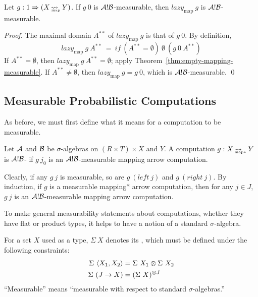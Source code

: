 \documentclass{llncs}
\newcommand{\arrow}{\rightsquigarrow}
\newcommand{\arrowlazy}{\ensuremath{lazy}}
\newcommand{\map}{_\mathrm{map}}
\DeclareMathOperator{\mapto}{\arrow_{\mspace{-21mu}\map}}
\newcommand{\lazymap}{\arrowlazy\map}
\DeclareMathOperator{\pmapto}{\arrow_{\mspace{-22mu}_{\mathrm{map*}}}}
\begin{document}
\begin{theorem}[measurability under $\lazymap$]
Let $g : 1 \tto (X \mapto Y)$. If $g~0$ is $\mathcal{A}!\mathcal{B}$-measurable, then $\lazymap~g$ is $\mathcal{A}!\mathcal{B}$-measurable.
\end{theorem}
\begin{proof}
The maximal domain $A^{**}$ of $\lazymap~g$ is that of $g~0$.
By definition,
\begin{equation}
	\lazymap~g~A^{**} \ = \ if~(A^{**} = \emptyset)~\emptyset~(g~0~A^{**})
\end{equation}
If $A^{**} = \emptyset$, then $\lazymap~g~A^{**} = \emptyset$; apply Theorem~\ref{thm:empty-mapping-measurable}.
If $A^{**} \neq \emptyset$, then $\lazymap~g = g~0$, which is $\mathcal{A}!\mathcal{B}$-measurable.
\qed
\end{proof}

\subsection{Measurable Probabilistic Computations}

As before, we must first define what it means for a computation to be measurable.

\begin{definition}
Let $\mathcal{A}$ and $\mathcal{B}$ be $\sigma$-algebras on $(R \times T) \times X$ and $Y$.
A computation $g : X \pmapto Y$ is $\mathcal{A}!\mathcal{B}$- if $g~j_0$ is an $\mathcal{A}!\mathcal{B}$-measurable mapping arrow computation.
\end{definition}

Clearly, if any $g~j$ is measurable, so are $g~(left~j)$ and $g~(right~j)$.
By induction, if $g$ is a measurable mapping* arrow computation, then for any $j \in J$, $g~j$ is an $\mathcal{A}!\mathcal{B}$-measurable mapping arrow computation.

To make general measurability statements about computations, whether they have flat or product types, it helps to have a notion of a standard $\sigma$-algebra.

\begin{definition}
For a set $X$ used as a type, $\Sigma~X$ denotes its , which must be defined under the following constraints:
\begin{align}
	\Sigma~\langle{X_1,X_2}\rangle & = \Sigma~X_1 \otimes \Sigma~X_2
	\label{eqn:standard-finite-product-rule}
\\
	\Sigma~(J \to X) & = (\Sigma~X)^{\otimes J}
	\label{eqn:standard-arbitrary-product-rule}
\end{align}
``Measurable'' means ``measurable with respect to standard $\sigma$-algebras.''
\label{def:standard-sigma-algebra}
\end{definition}
\end{document}
